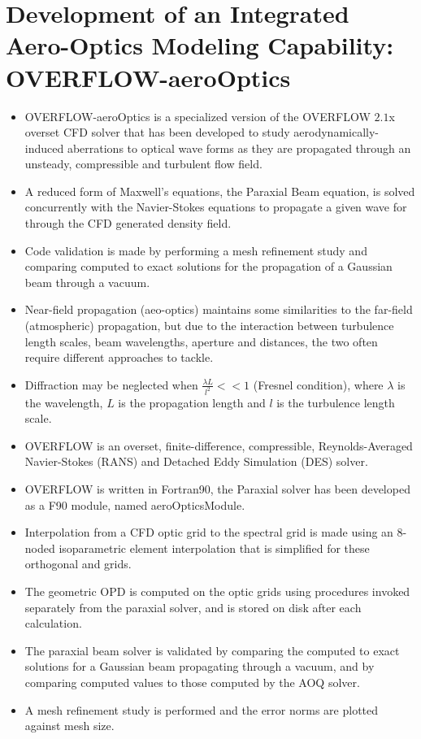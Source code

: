     \section{Development of an Integrated Aero-Optics Modeling Capability: OVERFLOW-aeroOptics \cite{coirier:aerospace:2010}}
        \begin{itemize}
            \item OVERFLOW-aeroOptics is a specialized version of the OVERFLOW $2.1$x overset CFD solver that has been developed to study aerodynamically-induced aberrations to optical wave forms as they are propagated through an unsteady, compressible and turbulent flow field.  
            \item A reduced form of Maxwell's equations, the Paraxial Beam equation, is solved concurrently with the Navier-Stokes equations to propagate a given wave for through the CFD generated density field. 
            \item Code validation is made by performing a mesh refinement study and comparing computed to exact solutions for the propagation of a Gaussian beam through a vacuum. 
            \item Near-field propagation (aeo-optics) maintains some similarities to the far-field (atmospheric) propagation, but due to the interaction between turbulence length scales, beam wavelengths, aperture and distances, the two often require different approaches to tackle.
            \item Diffraction may be neglected when $\frac{\lambda L}{l^2} << 1$ (Fresnel condition), where $\lambda$ is the wavelength, $L$ is the propagation length and $l$ is the turbulence length scale. 
            \item OVERFLOW is an overset, finite-difference, compressible, Reynolds-Averaged Navier-Stokes (RANS) and Detached Eddy Simulation (DES) solver.
            \item OVERFLOW is written in Fortran90, the Paraxial solver has been developed as a F90 module, named aeroOpticsModule.  
            \item Interpolation from a CFD optic grid to the spectral grid is made using an $8$-noded isoparametric element interpolation that is simplified for these orthogonal and grids.
            \item The geometric OPD is computed on the optic grids using procedures invoked separately from the paraxial solver, and is stored on disk after each calculation. 
            \item The paraxial beam solver is validated by comparing the computed to exact solutions for a Gaussian beam propagating through a vacuum, and by comparing computed values to those computed by the AOQ solver.
            \item A mesh refinement study is performed and the error norms are plotted against mesh size. 
        \end{itemize}


